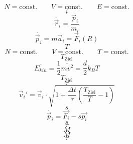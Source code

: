 \documentclass{scrreprt}
\begin{document}
\begin{equation}
  N = \text{const.}
  \qquad
  V = \text{const.}
  \qquad
  E = \text{const.}
\end{equation}
\begin{equation}
i
\end{equation}
\begin{equation}
  \dot{\vec r_i} = \frac{\vec p_i}{m_i}
\end{equation}
\begin{equation}
  \dot{\vec p_i} = m \vec a_i = \vec F_i(R)
\end{equation}
\begin{equation}
T
\end{equation}
\begin{equation}
  N = \text{const.}
  \qquad
  V = \text{const.}
  \qquad
  T = \text{const.}
\end{equation}
\begin{equation}
T_\text{Ziel}
\end{equation}
\begin{equation}
  \overline{E_{kin}} = \frac{1}{2} \overline{m v^2} = \frac{d}{2} k_B T
  \label{eq:ekanonisch}
\end{equation}
\begin{equation}
T_\text{Ziel}
\end{equation}
\begin{equation}
\tau
\end{equation}
\begin{equation}
  \vec v_i' = \vec v_i \cdot \sqrt{1 + \frac{\Delta t}{\tau} \left(\frac{T_\text{Ziel}}{T} - 1\right)}
  \label{eq:berendsen}
\end{equation}
\begin{equation}
s
\end{equation}
\begin{equation}
  \dot{\vec p_i} = \vec{F_i} - s \vec{p_i}
\end{equation}
\begin{equation}
s
\end{equation}
\begin{equation}
\tau
\end{equation}
\begin{equation}
M
\end{equation}
\begin{equation}
M
\end{equation}
\begin{equation}
\tau
\end{equation}
\end{document}

